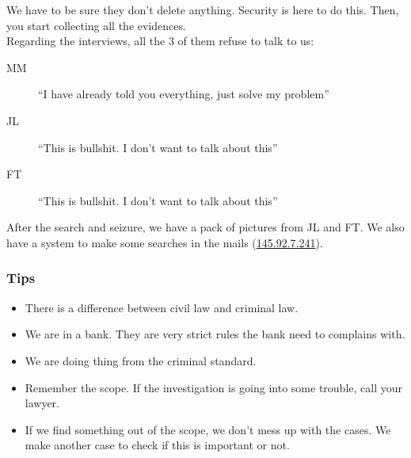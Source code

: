 We have to be sure they don't delete anything. Security is here to do this. Then, you start collecting all the evidences.\\
Regarding the interviews, all the 3 of them refuse to talk to us:
\begin{description}
	\item[MM] \enquote{I have already told you everything, just solve my problem}
	\item[JL] \enquote{This is bullshit. I don't want to talk about this}
	\item[FT] \enquote{This is bullshit. I don't want to talk about this}
\end{description}
After the search and seizure, we have a pack of pictures from JL and FT. We also have a system to make some searches in the mails (\url{145.92.7.241}).
\subsubsection{Tips}
\begin{itemize}
	\item There is a difference between civil law and criminal law.
	\item We are in a bank. They are very strict rules the bank need to complains with.
	\item We are doing thing from the criminal standard.
	\item Remember the scope. If the investigation is going into some trouble, call your lawyer.
	\item If we find something out of the scope, we don't mess up with the cases. We make another case to check if this is important or not.
\end{itemize}